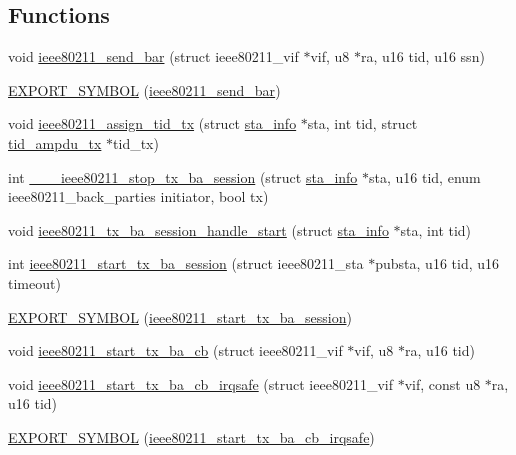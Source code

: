 \subsection*{Functions}
\begin{DoxyCompactItemize}
\item 
void \hyperlink{agg-tx_8c_a325d08db621f94aaf004ab00c95a84c0}{ieee80211\-\_\-send\-\_\-bar} (struct ieee80211\-\_\-vif $\ast$vif, u8 $\ast$ra, u16 tid, u16 ssn)
\item 
\hyperlink{agg-tx_8c_af595cdb6a5d3ec1dfadf2537645b8e24}{E\-X\-P\-O\-R\-T\-\_\-\-S\-Y\-M\-B\-O\-L} (\hyperlink{agg-tx_8c_a325d08db621f94aaf004ab00c95a84c0}{ieee80211\-\_\-send\-\_\-bar})
\item 
void \hyperlink{agg-tx_8c_a82539db85e814b802eb8127cb430565c}{ieee80211\-\_\-assign\-\_\-tid\-\_\-tx} (struct \hyperlink{structsta__info}{sta\-\_\-info} $\ast$sta, int tid, struct \hyperlink{structtid__ampdu__tx}{tid\-\_\-ampdu\-\_\-tx} $\ast$tid\-\_\-tx)
\item 
int \hyperlink{agg-tx_8c_a68ee93272e5342075143e403c64a3707}{\-\_\-\-\_\-\-\_\-ieee80211\-\_\-stop\-\_\-tx\-\_\-ba\-\_\-session} (struct \hyperlink{structsta__info}{sta\-\_\-info} $\ast$sta, u16 tid, enum ieee80211\-\_\-back\-\_\-parties initiator, bool tx)
\item 
void \hyperlink{agg-tx_8c_a85db32e08200e990e87a163b84505277}{ieee80211\-\_\-tx\-\_\-ba\-\_\-session\-\_\-handle\-\_\-start} (struct \hyperlink{structsta__info}{sta\-\_\-info} $\ast$sta, int tid)
\item 
int \hyperlink{agg-tx_8c_aec405fe32dc4aea0cf1ee7685427490c}{ieee80211\-\_\-start\-\_\-tx\-\_\-ba\-\_\-session} (struct ieee80211\-\_\-sta $\ast$pubsta, u16 tid, u16 timeout)
\item 
\hyperlink{agg-tx_8c_a367b814b4cbb7756b409860f90c79d1a}{E\-X\-P\-O\-R\-T\-\_\-\-S\-Y\-M\-B\-O\-L} (\hyperlink{agg-tx_8c_aec405fe32dc4aea0cf1ee7685427490c}{ieee80211\-\_\-start\-\_\-tx\-\_\-ba\-\_\-session})
\item 
void \hyperlink{agg-tx_8c_a5660c00056871426ddbd3e338f6a7f1c}{ieee80211\-\_\-start\-\_\-tx\-\_\-ba\-\_\-cb} (struct ieee80211\-\_\-vif $\ast$vif, u8 $\ast$ra, u16 tid)
\item 
void \hyperlink{agg-tx_8c_a8a606b32f4d3f0848c68705196e32e86}{ieee80211\-\_\-start\-\_\-tx\-\_\-ba\-\_\-cb\-\_\-irqsafe} (struct ieee80211\-\_\-vif $\ast$vif, const u8 $\ast$ra, u16 tid)
\item 
\hyperlink{agg-tx_8c_affce7c6c97496ce29d5a89f4a29baa96}{E\-X\-P\-O\-R\-T\-\_\-\-S\-Y\-M\-B\-O\-L} (\hyperlink{agg-tx_8c_a8a606b32f4d3f0848c68705196e32e86}{ieee80211\-\_\-start\-\_\-tx\-\_\-ba\-\_\-cb\-\_\-irqsafe})

\end{DoxyCompactItemize}
